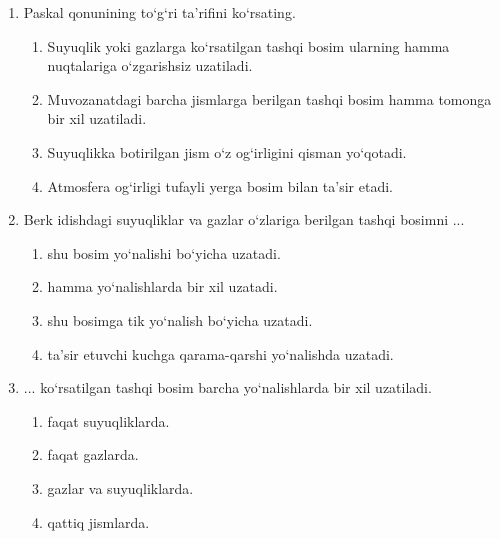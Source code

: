 \begin{enumerate}

\begin{enumerate}[label=\Alph*)]
\item 5
\item 4
\item 3
\item 2
\end{enumerate}

\item Paskal qonunining to‘g‘ri ta’rifini ko‘rsating. 
\begin{enumerate}[label=\Alph*)]
\item Suyuqlik yoki gazlarga ko‘rsatilgan tashqi bosim ularning hamma nuqtalariga o‘zgarishsiz uzatiladi. 
\item Muvozanatdagi barcha jismlarga berilgan tashqi bosim hamma tomonga bir xil uzatiladi.
\item Suyuqlikka botirilgan jism o‘z og‘irligini qisman yo‘qotadi. 
\item Atmosfera og‘irligi tufayli yerga bosim bilan ta’sir etadi. 

\end{enumerate}

\item Berk idishdagi suyuqliklar va gazlar o‘zlariga berilgan tashqi bosimni ... 
\begin{enumerate}[label=\Alph*)]
\item shu bosim yo‘nalishi bo‘yicha uzatadi. 
\item hamma yo‘nalishlarda bir xil uzatadi. 
\item shu bosimga tik yo‘nalish bo‘yicha uzatadi. 
\item ta’sir etuvchi kuchga qarama-qarshi yo‘nalishda uzatadi. 
\end{enumerate}


\item ... ko‘rsatilgan tashqi bosim barcha yo‘nalishlarda bir xil uzatiladi. 
\begin{enumerate}[label=\Alph*)]
\item faqat suyuqliklarda.
\item faqat gazlarda. 
\item gazlar va suyuqliklarda.
\item qattiq jismlarda. 
\end{enumerate}


\end{enumerate}
